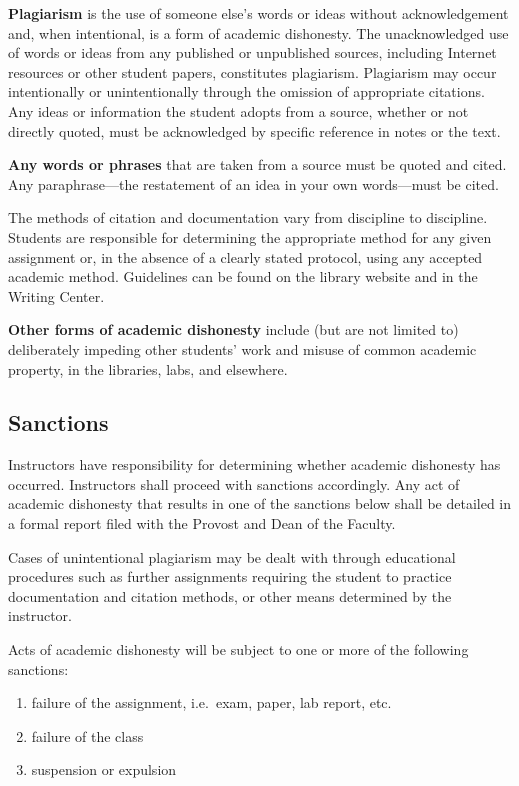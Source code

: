 \documentclass[
  letterpaper,
]{scrbook}
\providecommand{\tightlist}{%
  \setlength{\itemsep}{0pt}\setlength{\parskip}{0pt}}
\begin{document}
\textbf{Plagiarism} is the use of someone else's words or ideas without
acknowledgement and, when intentional, is a form of academic dishonesty.
The unacknowledged use of words or ideas from any published or
unpublished sources, including Internet resources or other student
papers, constitutes plagiarism. Plagiarism may occur intentionally or
unintentionally through the omission of appropriate citations. Any ideas
or information the student adopts from a source, whether or not directly
quoted, must be acknowledged by specific reference in notes or the text.

\textbf{Any words or phrases} that are taken from a source must be
quoted and cited. Any paraphrase---the restatement of an idea in your
own words---must be cited.

The methods of citation and documentation vary from discipline to
discipline. Students are responsible for determining the appropriate
method for any given assignment or, in the absence of a clearly stated
protocol, using any accepted academic method. Guidelines can be found on
the library website and in the Writing Center.

\textbf{Other forms of academic dishonesty} include (but are not limited
to) deliberately impeding other students' work and misuse of common
academic property, in the libraries, labs, and elsewhere.

\subsection{Sanctions}\label{sanctions}

Instructors have responsibility for determining whether academic
dishonesty has occurred. Instructors shall proceed with sanctions
accordingly. Any act of academic dishonesty that results in one of the
sanctions below shall be detailed in a formal report filed with the
Provost and Dean of the Faculty.

Cases of unintentional plagiarism may be dealt with through educational
procedures such as further assignments requiring the student to practice
documentation and citation methods, or other means determined by the
instructor.

Acts of academic dishonesty will be subject to one or more of the
following sanctions:

\begin{enumerate}
\def\labelenumi{\arabic{enumi}.}
\tightlist
\item
  failure of the assignment, i.e.~exam, paper, lab report, etc.
\item
  failure of the class
\item
  suspension or expulsion
\end{enumerate}
\end{document}
